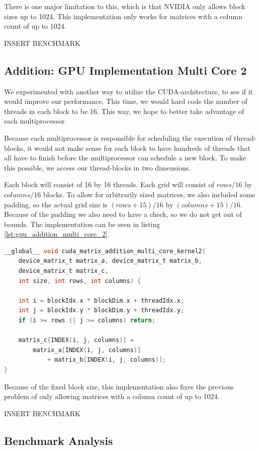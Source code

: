 There is one major limitation to this, which is that NVIDIA only allows block sizes up to 1024. This implementation only works for matrices with a column count of up to 1024.

INSERT BENCHMARK

\subsection{Addition: GPU Implementation Multi Core 2}
We experimented with another way to utilize the CUDA-architecture, to see if it would improve our performance. This time, we would hard code the number of threads in each block to be 16. This way, we hope to better take advantage of each multiprocessor. 

Because each multiprocessor is responsible for scheduling the execution of thread-blocks, it would not make sense for each block to have hundreds of threads that all have to finish before the multiprocessor can schedule a new block. To make this possible, we access our thread-blocks in two dimensions. 

Each block will consist of 16 by 16 threads. Each grid will consist of $rows / 16$ by $columns / 16$ blocks. To allow for arbitrarily sized matrices, we also included some padding, so the actual grid size is $(rows + 15) / 16$ by $(columns + 15) / 16$. Because of the padding we also need to have a check, so we do not get out of bounds. The implementation can be seen in listing \ref{lst:gpu_addition_multi_core_2}.

\begin{lstlisting}[language=C, caption={GPU addition multi core 2}, label={lst:gpu_addition_multi_core_2}]
__global__ void cuda_matrix_addition_multi_core_kernel2(
    device_matrix_t matrix_a, device_matrix_t matrix_b,
    device_matrix_t matrix_c, 
    int size, int rows, int columns) {
    
    int i = blockIdx.x * blockDim.x + threadIdx.x;
    int j = blockIdx.y * blockDim.y + threadIdx.y;
    if (i >= rows || j >= columns) return;

    matrix_c[INDEX(i, j, columns)] =
        matrix_a[INDEX(i, j, columns)] 
            + matrix_b[INDEX(i, j, columns)];
}
\end{lstlisting}

Because of the fixed block size, this implementation also fixes the previous problem of only allowing matrices with a column count of up to 1024.

INSERT BENCHMARK

\subsection{Benchmark Analysis}